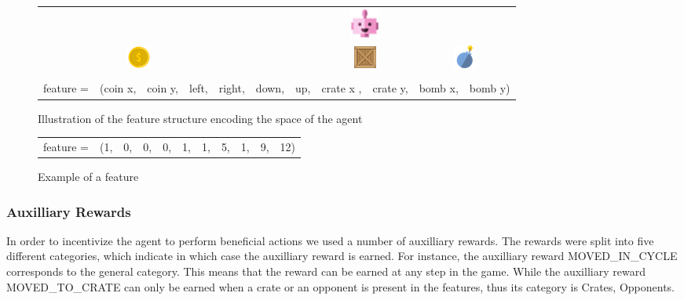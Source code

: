 \documentclass[
	letterpaper, %
	10pt, %
]{CSUniSchoolLabReport}
\begin{document}
\begin{center}
	\begin{figure}[H]
		\begin{tabular}{ccccccccccc}
			          &                                                        &         &       &        &       &                                                         & \multicolumn{2}{c}{\includegraphics[width=1cm]{Figures/robot_pink.png}} &                              \\
			          & \multicolumn{2}{c}{\includegraphics{Figures/coin.png}} &         &       &        &       & \multicolumn{2}{c}{\includegraphics{Figures/crate.png}} & \multicolumn{2}{c}{\includegraphics{Figures/bomb_blue.png}}                                            \\
			\\
			feature = & (coin x,                                               & coin y, & left, & right, & down, & up,                                                     & crate x ,                                                               & crate y, & bomb x, & bomb y)
		\end{tabular}
		\caption{Illustration of the feature structure encoding the space of the agent}
	\end{figure}
\end{center}


\begin{center}
	\begin{figure}[h]
		\centering
		\begin{tabular}{ccccccccccc}
			feature = & (1, & 0, & 0, & 0, & 1, & 1, & 5, & 1, & 9, & 12)
		\end{tabular}
		\caption{Example of a feature }
		\label{fig:example}
	\end{figure}
\end{center}



\subsubsection*{Auxilliary Rewards}
In order to incentivize the agent to perform beneficial actions we used a number of auxilliary rewards.
The rewards were split into five different categories, which indicate in which case the auxilliary reward
is earned. For instance, the auxilliary reward MOVED\_IN\_CYCLE corresponds to the general category. This
means that the reward can be earned at any step in the game. While the auxilliary reward MOVED\_TO\_CRATE can
only be earned when a crate or an opponent is present in the features, thus its category is Crates, Opponents.
\end{document}
